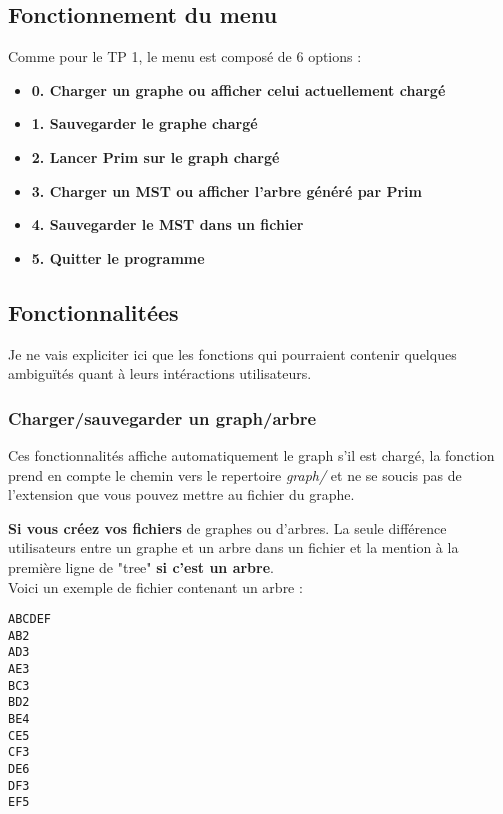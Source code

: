 \documentclass[12pt, a4paper,twoside]{article}
\begin{document}
    \subsection{Fonctionnement du menu}

    Comme pour le TP 1, le menu est composé de 6 options :

    \begin{itemize}
        \item \bf{0.} Charger un graphe ou afficher celui actuellement chargé
        \item \bf{1.} Sauvegarder le graphe chargé
        \item \bf{2.} Lancer Prim sur le graph chargé
        \item \bf{3.} Charger un MST ou afficher l'arbre généré par Prim
        \item \bf{4.} Sauvegarder le MST dans un fichier
        \item \bf{5.} Quitter le programme
    \end{itemize}

    
    \subsection{Fonctionnalitées}

        Je ne vais expliciter ici que les fonctions qui pourraient contenir quelques ambiguïtés quant à leurs intéractions utilisateurs.

        \subsubsection{Charger/sauvegarder un graph/arbre}
            Ces fonctionnalités affiche automatiquement le graph s'il est chargé, la fonction prend en compte le chemin vers le
            repertoire \textit{graph/} et ne se soucis pas de l'extension que vous pouvez mettre au fichier du graphe.
            \newline
            \newline

            \textbf{Si vous créez vos fichiers} de graphes ou d'arbres. La seule différence utilisateurs entre un graphe et un arbre dans un fichier et la mention à la première ligne de "tree"
            \textbf{si c'est un arbre}.
            \\
            \newline
            Voici un exemple de fichier contenant un arbre :

            \lstset{style=Clang}
            \begin{lstlisting}[language=Clang, caption=graphTTP.txt]
ABCDEF
AB2
AD3
AE3
BC3
BD2
BE4
CE5
CF3
DE6
DF3
EF5\end{lstlisting}
    \newpage
\end{document}
